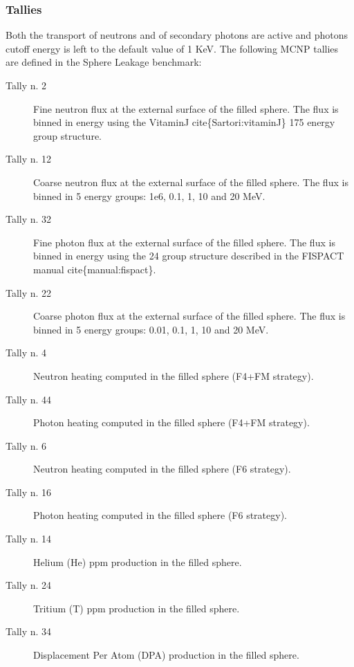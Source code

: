 \documentclass[letterpaper,10pt,english]{sphinxmanual}
\begin{document}
\subsubsection{Tallies}
\label{\detokenize{usage/benchmarks:tallies}}
Both the transport of neutrons and of secondary photons are active and photons cut\sphinxhyphen{}off energy  is
left to the default value of 1 KeV.
The following MCNP tallies are defined in the Sphere Leakage benchmark:
\begin{description}
\item[{Tally n. 2}] \leavevmode
Fine neutron flux at the external surface of the filled sphere. The flux is binned in energy using the Vitamin\sphinxhyphen{}J cite\{Sartori:vitaminJ\} 175 energy group structure.

\item[{Tally n. 12}] \leavevmode
Coarse neutron flux at the external surface of the filled sphere. The flux is binned in 5 energy groups: 1e\sphinxhyphen{}6, 0.1, 1, 10 and 20 MeV.

\item[{Tally n. 32}] \leavevmode
Fine photon flux at the external surface of the filled sphere. The flux is binned in energy using the 24 group structure described in the FISPACT manual cite\{manual:fispact\}.

\item[{Tally n. 22}] \leavevmode
Coarse photon flux at the external surface of the filled sphere. The flux is binned in 5 energy groups: 0.01, 0.1, 1, 10 and 20 MeV.

\item[{Tally n. 4}] \leavevmode
Neutron heating computed in the filled sphere (F4+FM strategy).

\item[{Tally n. 44}] \leavevmode
Photon heating computed in the filled sphere (F4+FM strategy).

\item[{Tally n. 6}] \leavevmode
Neutron heating computed in the filled sphere (F6 strategy).

\item[{Tally n. 16}] \leavevmode
Photon heating computed in the filled sphere (F6 strategy).

\item[{Tally n. 14}] \leavevmode
Helium (He) ppm production in the filled sphere.

\item[{Tally n. 24}] \leavevmode
Tritium (T) ppm production in the filled sphere.

\item[{Tally n. 34}] \leavevmode
Displacement Per Atom (DPA) production in the filled sphere.

\end{description}
\end{document}
